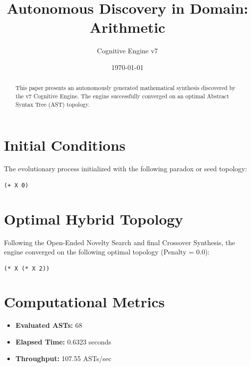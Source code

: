 \documentclass{article}
\title{Autonomous Discovery in Domain: Arithmetic}
\author{Cognitive Engine v7}
\date{\today}
\begin{document}
\maketitle
\begin{abstract}
This paper presents an autonomously generated mathematical synthesis discovered by the v7 Cognitive Engine. The engine successfully converged on an optimal Abstract Syntax Tree (AST) topology.\end{abstract}
\section{Initial Conditions}
The evolutionary process initialized with the following paradox or seed topology:
\begin{verbatim}
(+ X 0)
\end{verbatim}
\section{Optimal Hybrid Topology}
Following the Open-Ended Novelty Search and final Crossover Synthesis, the engine converged on the following optimal topology (Penalty = 0.0):
\begin{verbatim}
(* X (* X 2))
\end{verbatim}
\section{Computational Metrics}
\begin{itemize}
  \item \textbf{Evaluated ASTs:} 68
  \item \textbf{Elapsed Time:} 0.6323 seconds
  \item \textbf{Throughput:} 107.55 ASTs/sec
\end{itemize}
\end{document}
